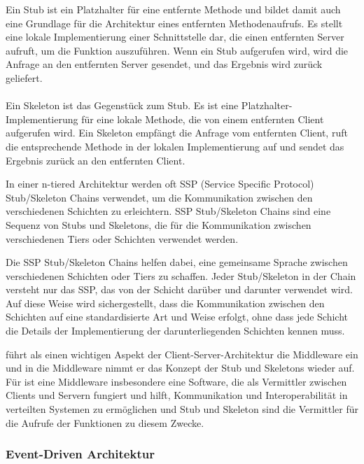 \begin{itemize}
Ein Stub ist ein Platzhalter für eine entfernte Methode und bildet damit auch eine Grundlage für die Architektur eines entfernten Methodenaufrufs. Es stellt eine lokale Implementierung einer Schnittstelle dar, die einen entfernten Server aufruft, um die Funktion auszuführen. Wenn ein Stub aufgerufen wird, wird die Anfrage an den entfernten Server gesendet, und das Ergebnis wird zurück geliefert.
\\\\
Ein Skeleton ist das Gegenstück zum Stub. Es ist eine Platzhalter-Implementierung für eine lokale Methode, die von einem entfernten Client aufgerufen wird. Ein Skeleton empfängt die Anfrage vom entfernten Client, ruft die entsprechende Methode in der lokalen Implementierung auf und sendet das Ergebnis zurück an den entfernten Client.

In einer n-tiered Architektur werden oft SSP (Service Specific Protocol) Stub/Skeleton Chains verwendet, um die Kommunikation zwischen den verschiedenen Schichten zu erleichtern. SSP Stub/Skeleton Chains sind eine Sequenz von Stubs und Skeletons, die für die Kommunikation zwischen verschiedenen Tiers oder Schichten verwendet werden.

Die SSP Stub/Skeleton Chains helfen dabei, eine gemeinsame Sprache zwischen verschiedenen Schichten oder Tiers zu schaffen. Jeder Stub/Skeleton in der Chain versteht nur das SSP, das von der Schicht darüber und darunter verwendet wird. Auf diese Weise wird sichergestellt, dass die Kommunikation zwischen den Schichten auf eine standardisierte Art und Weise erfolgt, ohne dass jede Schicht die Details der Implementierung der darunterliegenden Schichten kennen muss.
\end{itemize}

\cite{tanenbaum2017distributed} führt als einen wichtigen Aspekt der Client-Server-Architektur die Middleware ein und in die Middleware nimmt er das Konzept der Stub und Skeletons wieder auf. Für \cite{tanenbaum2017distributed} ist eine Middleware insbesondere eine Software, die als Vermittler zwischen Clients und Servern fungiert und hilft, Kommunikation und Interoperabilität in verteilten Systemen zu ermöglichen und Stub und Skeleton sind die Vermittler für die Aufrufe der Funktionen zu diesem Zwecke.
              
\subsubsection{Event-Driven Architektur}

